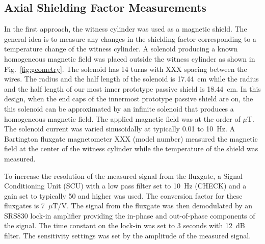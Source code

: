 \documentclass[review]{elsarticle}
\begin{document}
\subsection{Axial Shielding Factor Measurements}
In the first approach, the witness cylinder was used as a magnetic
shield.  The general idea is to measure any changes in the shielding
factor corresponding to a temperature change of the witness cylinder.
A solenoid producing a known homogeneous magnetic field was placed
outside the witness cylinder as shown in Fig.~\ref{fig:geometry}.
The solenoid has 14 turns with XXX spacing between the wires. The radius and the half length of the solenoid is 17.44~cm while the radius and the half length of our most inner prototype passive shield is 18.44~cm. In this design, when the end caps of the innermost prototype passive shield are on, the this solenoid can be approximated by an infinite solenoid that produces a homogeneous magnetic field. 
The applied magnetic field was at the order of $\mu$T.
The solenoid current was varied sinusoidally at typically 0.01 to
10~Hz. 
A Bartington fluxgate magnetometer XXX (model number) measured the magnetic field at the center of the
witness cylinder while the temperature of the shield was measured.

To increase the resolution of the measured signal from the fluxgate, a Signal Conditioning Unit (SCU) with a low pass filter set to 10~Hz (CHECK) and a gain set to typically 50 and higher was used. The conversion factor for these fluxgates is 7~$\mu$T/V.
The signal from the fluxgate was then demodulated by an SRS830 lock-in
amplifier providing the in-phase and out-of-phase components of the
signal. The time constant on the lock-in was set to 3 seconds with 12~dB filter. The sensitivity settings was set by the amplitude of the measured signal.
\end{document}
